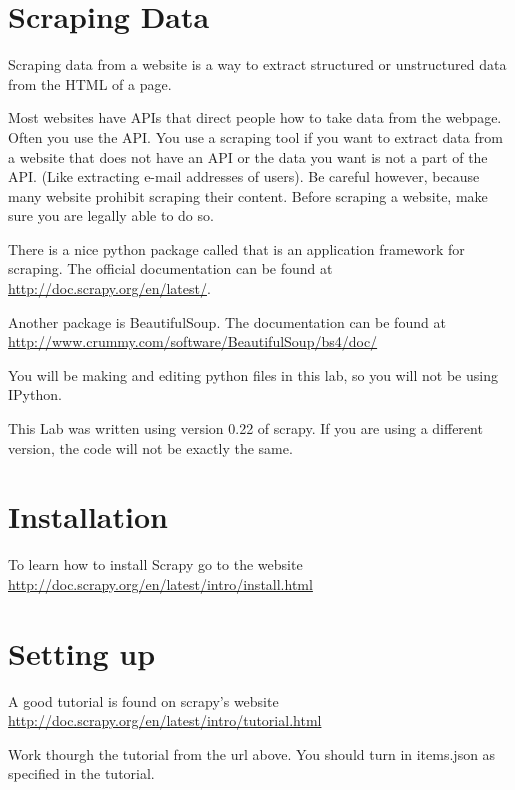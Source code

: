 
\section*{Scraping Data}
Scraping data from a website is a way to extract structured or unstructured data from the HTML of a page.

Most websites have APIs that direct people how to take data from the webpage. Often you use the API. You use a scraping tool if you want to extract data from a website that does not have an API or the data you want is not a part of the API. (Like extracting e-mail addresses of users).  Be careful however, because many website prohibit scraping their content.  Before scraping a website, make sure you are legally able to do so.

There is a nice python package called  that is an application framework for scraping.  The official documentation can be found at \url{http://doc.scrapy.org/en/latest/}. 

Another package is BeautifulSoup.  The documentation can be found at \url{http://www.crummy.com/software/BeautifulSoup/bs4/doc/}

\begin{info}
You will be making and editing python files in this lab, so you will not be using IPython.
\end{info}

\begin{warn}
This Lab was written using version 0.22 of scrapy. If you are using a different version, the code will not be exactly the same.
\end{warn}

\section*{Installation}

To learn how to install Scrapy go to the website \url{http://doc.scrapy.org/en/latest/intro/install.html}

\section*{Setting up}
A good tutorial is found on scrapy's website
\url{http://doc.scrapy.org/en/latest/intro/tutorial.html}

\begin{problem}
Work thourgh the tutorial from the url above. You should turn in items.json as specified in the tutorial.
\end{problem}

